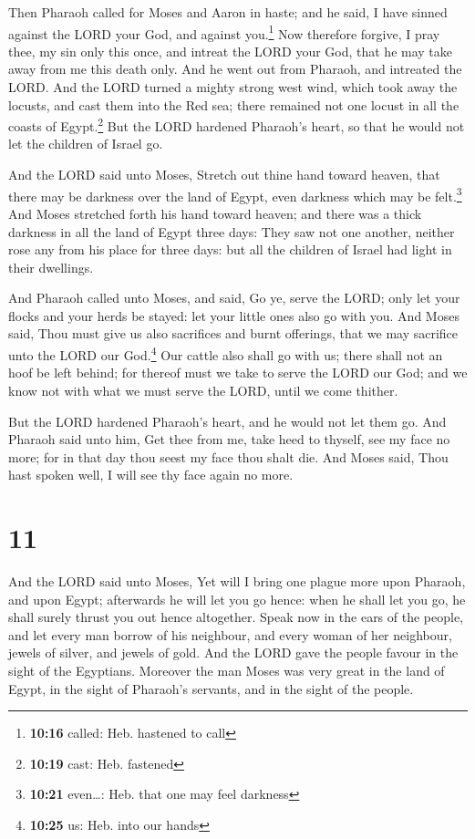  Then Pharaoh called for Moses and Aaron in haste; and he
said, I have sinned against the LORD your God, and against
you.\footnote{\textbf{10:16} called: Heb. hastened to call}
 Now therefore forgive, I pray thee, my sin only this
once, and intreat the LORD your God, that he may take away from me this
death only.  And he went out from Pharaoh, and intreated
the LORD.  And the LORD turned a mighty strong west wind,
which took away the locusts, and cast them into the Red sea; there
remained not one locust in all the coasts of Egypt.\footnote{\textbf{10:19}
  cast: Heb. fastened}  But the LORD hardened Pharaoh's
heart, so that he would not let the children of Israel go.

 And the LORD said unto Moses, Stretch out thine hand
toward heaven, that there may be darkness over the land of Egypt, even
darkness which may be felt.\footnote{\textbf{10:21} even\ldots: Heb.
  that one may feel darkness}  And Moses stretched forth
his hand toward heaven; and there was a thick darkness in all the land
of Egypt three days:  They saw not one another, neither
rose any from his place for three days: but all the children of Israel
had light in their dwellings.

 And Pharaoh called unto Moses, and said, Go ye, serve
the LORD; only let your flocks and your herds be stayed: let your little
ones also go with you.  And Moses said, Thou must give us
also sacrifices and burnt offerings, that we may sacrifice unto the LORD
our God.\footnote{\textbf{10:25} us: Heb. into our hands}
 Our cattle also shall go with us; there shall not an
hoof be left behind; for thereof must we take to serve the LORD our God;
and we know not with what we must serve the LORD, until we come thither.

 But the LORD hardened Pharaoh's heart, and he would not
let them go.  And Pharaoh said unto him, Get thee from
me, take heed to thyself, see my face no more; for in that day thou
seest my face thou shalt die.  And Moses said, Thou hast
spoken well, I will see thy face again no more.

\hypertarget{section-10}{%
\section{11}\label{section-10}}

 And the LORD said unto Moses, Yet will I bring one plague
more upon Pharaoh, and upon Egypt; afterwards he will let you go hence:
when he shall let you go, he shall surely thrust you out hence
altogether.  Speak now in the ears of the people, and let
every man borrow of his neighbour, and every woman of her neighbour,
jewels of silver, and jewels of gold.  And the LORD gave
the people favour in the sight of the Egyptians. Moreover the man Moses
was very great in the land of Egypt, in the sight of Pharaoh's servants,
and in the sight of the people.


